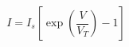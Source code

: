\documentclass[preview]{standalone}
\begin{document}
\[I = I_s \left[\exp\left(\frac{V}{V_T}\right) - 1\right] \tag{2.11}\]
\end{document}
